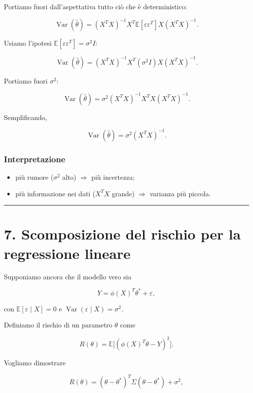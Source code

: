 \documentclass[
]{article}
\providecommand{\tightlist}{%
  \setlength{\itemsep}{0pt}\setlength{\parskip}{0pt}}
\begin{document}
Portiamo fuori dall'aspettativa tutto ciò che è deterministico:

\[
\operatorname{Var}(\hat\theta)
=
(X^TX)^{-1}X^T
\mathbb{E}[\varepsilon\varepsilon^T]
X(X^TX)^{-1}.
\]

Usiamo l'ipotesi \(\mathbb{E}[\varepsilon\varepsilon^T]=\sigma^2 I\):

\[
\operatorname{Var}(\hat\theta)
=
(X^TX)^{-1}X^T(\sigma^2 I)X(X^TX)^{-1}.
\]

Portiamo fuori \(\sigma^2\):

\[
\operatorname{Var}(\hat\theta)
=
\sigma^2(X^TX)^{-1}X^TX(X^TX)^{-1}.
\]

Semplificando,

\[
\operatorname{Var}(\hat\theta)=\sigma^2(X^TX)^{-1}.
\]

\subsubsection{Interpretazione}\label{interpretazione-4}

\begin{itemize}
\tightlist
\item
  più rumore (\(\sigma^2\) alto) \(\Rightarrow\) più incertezza;
\item
  più informazione nei dati (\(X^TX\) grande) \(\Rightarrow\) varianza
  più piccola.
\end{itemize}

\begin{center}\rule{0.5\linewidth}{0.5pt}\end{center}

\section{7. Scomposizione del rischio per la regressione
lineare}\label{scomposizione-del-rischio-per-la-regressione-lineare}

Supponiamo ancora che il modello vero sia

\[
Y = \phi(X)^T\theta^* + \varepsilon,
\]

con \(\mathbb{E}[\varepsilon\mid X]=0\) e
\(\operatorname{Var}(\varepsilon\mid X)=\sigma^2\).

Definiamo il rischio di un parametro \(\theta\) come

\[
R(\theta)=\mathbb{E}\big[(\phi(X)^T\theta - Y)^2\big].
\]

Vogliamo dimostrare

\[
R(\theta)=
(\theta-\theta^*)^T\Sigma(\theta-\theta^*)+\sigma^2,
\]
\end{document}
